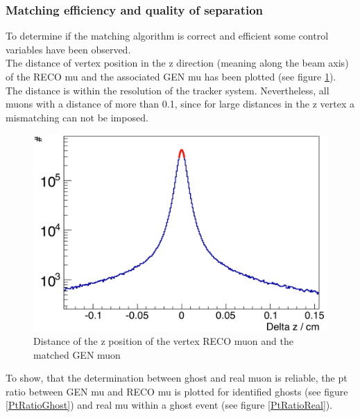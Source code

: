 \subsubsection{Matching efficiency and quality of separation}
To determine if the matching algorithm is correct and efficient some control variables have been observed.\\
The distance of vertex position in the z direction (meaning along the beam axis) of the RECO mu and the associated GEN mu has been plotted (see figure \ref{DeltaZMatching}). The distance is within the resolution of the tracker system. Nevertheless, all muons with a distance of more than 0.1, since for large distances in the z vertex a mismatching can not be imposed.\\
\begin{figure}[b]
\centering
\begin{minipage}[t]{0.95\textwidth}
\includegraphics[width=\textwidth]{Figures/scheuch/DeltaZ.png}
\caption{Distance of the z position of the vertex RECO muon and the matched GEN muon}
\label{DeltaZMatching}
\end{minipage}
\end{figure}
To show, that the determination between ghost and real muon is reliable, the pt ratio between GEN mu and RECO mu is plotted for identified ghosts (see figure \ref{PtRatioGhost}) and real mu within a ghost event (see figure \ref{PtRatioReal}).

